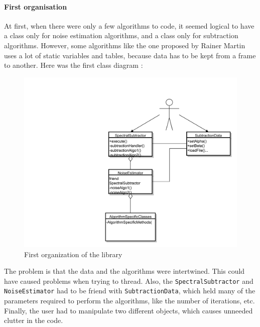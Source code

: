 \paragraph{First organisation}
At first, when there were only a few algorithms to code, it seemed logical to have a class only for noise estimation algorithms, and a class only for subtraction algorithms. However, some algorithms like the one proposed by Rainer Martin\cite{martin2001noise} uses a lot of static variables and tables, because data has to be kept from a frame to another. 
Here was the first class diagram : 
\begin{figure}[H]
\begin{center}
\hspace{-11em}
\includegraphics[scale=0.5]{old.pdf}
\caption{First organization of the library}
\label{diag_api_chords}
\end{center}
\end{figure}
The problem is that the data and the algorithms were intertwined. This could have caused problems when trying to thread. Also, the \texttt{SpectralSubtractor} and \texttt{NoiseEstimator} had to be friend with \texttt{SubtractionData}, which held many of the parameters required to perform the algorithms, like the number of iterations, etc.
Finally, the user had to manipulate two different objects, which causes unneeded clutter in the code.
